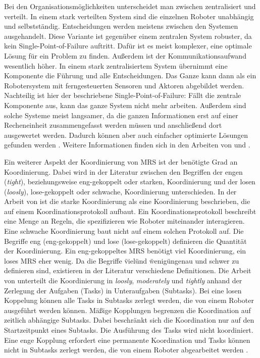 Bei den Organisationsmöglichkeiten unterscheidet man zwischen zentralisiert und verteilt. In einem stark verteilten System sind die einzelnen Roboter unabhängig und selbstständig. Entscheidungen werden meistens zwischen den Systemen ausgehandelt. Diese Variante ist gegenüber einem zentralen System robuster, da kein Single-Point-of-Failure auftritt. Dafür ist es meist komplexer, eine optimale Lösung für ein Problem zu finden. Außerdem ist der Kommunikationsaufwand wesentlich höher. In einem stark zentralisiertem System übernimmt eine Komponente die Führung und alle Entscheidungen. Das Ganze kann dann als ein Robotersystem mit ferngesteuerten Sensoren und Aktoren abgebildet werden. Nachteilig ist hier der beschriebene Single-Point-of-Failure: Fällt die zentrale Komponente aus, kann das ganze System nicht mehr arbeiten. Außerdem sind solche Systeme meist langsamer, da die ganzen Informationen erst auf einer Recheneinheit zusammengefasst werden müssen und anschließend dort ausgewertet werden. Dadurch können aber auch einfacher optimierte Lösungen gefunden werden \citep{lundh2006plan}. Weitere Informationen finden sich in den Arbeiten von \cite{farinelli2004multirobot} und \cite{dias2003comparative}. 

Ein weiterer Aspekt der Koordinierung von MRS ist der benötigte Grad an Koordinierung. Dabei wird in der Literatur zwischen den Begriffen der engen (\textit{tight}), beziehungsweise eng-gekoppelt oder starken, Koordinierung und der losen (\textit{loosly}), lose-gekoppelt oder schwache, Koordinierung unterschieden. In der Arbeit von \cite{farinelli2004multirobot} ist die starke Koordinierung als eine Koordinierung beschrieben, die auf einem Koordinationsprotokoll aufbaut. Ein Koordinationsprotokoll beschreibt eine Menge an Regeln, die spezifizieren wie Roboter miteinander interagieren. Eine schwache Koordinierung baut nicht auf einem solchen Protokoll auf. Die Begriffe eng (eng-gekoppelt) und lose (lose-gekoppelt) definieren die Quantität der Koordinierung. Ein eng-gekoppeltes MRS benötigt viel Koordinierung, ein loses MRS eher wenig. Da die Begriffe \"viel\" und \"wenig\" ungenau und schwer zu definieren sind, existieren in der Literatur verschiedene Definitionen. Die Arbeit von \cite{kalra2004hoplites} unterteilt die Koordinierung in \textit{loosly}, \textit{moderately} und \textit{tightly} anhand der Zerlegung der Aufgaben (Tasks) in Unteraufgaben (Subtasks). Bei eine losen Koppelung können alle Tasks in Subtasks zerlegt werden, die von einem Roboter ausgeführt werden können. Mäßige Kopplungen begrenzen die Koordination auf zeitlich abhängige Subtasks. Dabei beschränkt sich die Koordination nur auf den Startzeitpunkt eines Subtasks. Die Ausführung des Tasks wird nicht koordiniert. Eine enge Kopplung erfordert eine permanente Koordination und Tasks können nicht in Subtasks zerlegt werden, die von einem Roboter abgearbeitet werden \citep{lundh2006plan}.

